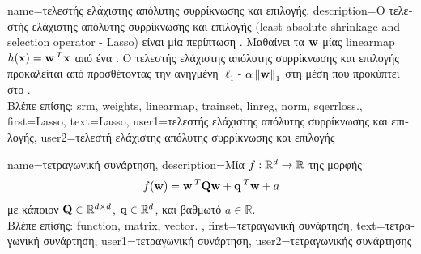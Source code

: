 {name={\foreignlanguage{greek}{τελεστής ελάχιστης απόλυτης συρρίκνωσης και επιλογής}}, 
	description={\foreignlanguage{greek}{Ο τελεστής ελάχιστης απόλυτης συρρίκνωσης και 
		επιλογής} 
		(least absolute shrinkage and selection operator - Lasso)
		\foreignlanguage{greek}{είναι μία περίπτωση} . \foreignlanguage{greek}{Μαθαίνει τα} 
		 ${\bf w}$ \foreignlanguage{greek}{μίας} \gls{linearmap} 
		$h({\bf x}) = {\bf w}\,^{T} {\bf x}$ \foreignlanguage{greek}{από ένα} . 
		\foreignlanguage{greek}{Ο τελεστής ελάχιστης απόλυτης συρρίκνωσης και επιλογής προκαλείται από} 
		 \foreignlanguage{greek}{προσθέτοντας την ανηγμένη} $\ell_{1}$- 
		$\alpha \left\Vert {{\bf w}} \right\Vert_{1}$ \foreignlanguage{greek}{στη μέση}  
		\foreignlanguage{greek}{που προκύπτει στο} .\\
		\foreignlanguage{greek}{Βλέπε επίσης:} \gls{srm}, \gls{weights}, \gls{linearmap}, \gls{trainset}, \gls{linreg}, \gls{norm}, \gls{sqerrloss}.},
	first={Lasso},
	text={Lasso},
	user1={\foreignlanguage{greek}{τελεστής ελάχιστης απόλυτης συρρίκνωσης και επιλογής}}, %
  	user2={\foreignlanguage{greek}{τελεστή ελάχιστης απόλυτης συρρίκνωσης και επιλογής}} %
}

{name={\foreignlanguage{greek}{τετραγωνική συνάρτηση}},
	description={\foreignlanguage{greek}{Μία}  
		$f: \mathbb{R}^{d} \rightarrow \mathbb{R}$ \foreignlanguage{greek}{της μορφής}  
		$$f({\bf w}) =  {\bf w}\,^{T} \mathbf{Q} \mathbf{w} + \mathbf{q}\,^{T} {\bf w}+a$$  
		\foreignlanguage{greek}{με κάποιον}  $\mathbf{Q} \in \mathbb{R}^{d \times d}$, 
		 ${\bf q} \in \mathbb{R}^{d}$, \foreignlanguage{greek}{και βαθμωτό} $a \in \mathbb{R}$. \\
		\foreignlanguage{greek}{Βλέπε επίσης:} \gls{function}, \gls{matrix}, \gls{vector}. },
	first={\foreignlanguage{greek}{τετραγωνική συνάρτηση}},
	text={\foreignlanguage{greek}{τετραγωνική συνάρτηση}},
	user1={\foreignlanguage{greek}{τετραγωνική συνάρτηση}}, %
  	user2={\foreignlanguage{greek}{τετραγωνικής συνάρτησης}} %
}

